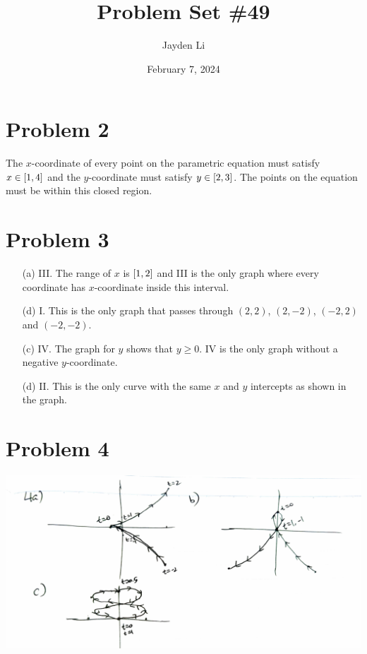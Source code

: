 \documentclass{article}
\title{Problem Set \#49}
\author{Jayden Li}
\date{February 7, 2024}
\begin{document}
\setlength{\abovedisplayskip}{0pt}
\fontsize{12pt}{12pt}\selectfont
\maketitle

\section*{Problem 2}
The $x$-coordinate of every point on the parametric equation must satisfy $x\in\interval{1}{4}$ and the $y$-coordinate must satisfy $y\in\interval{2}{3}$. The points on the equation must be within this closed region.

\section*{Problem 3}
\begin{itemize}
\item[(a)]
	III. The range of $x$ is $\interval{1}{2}$ and III is the only graph where every coordinate has $x$-coordinate inside this interval.

\item[(d)]
	I. This is the only graph that passes through $(2,2)$, $(2,-2)$, $(-2,2)$ and $(-2,-2)$.

\item[(c)]
	IV. The graph for $y$ shows that $y\geq0$. IV is the only graph without a negative $y$-coordinate.

\item[(d)]
	II. This is the only curve with the same $x$ and $y$ intercepts as shown in the graph. 

\end{itemize}

\section*{Problem 4}
\vspace*{-15pt}
\begin{center}
	\includegraphics*[width=0.85\linewidth]{q4.png}
\end{center}
\end{document}
